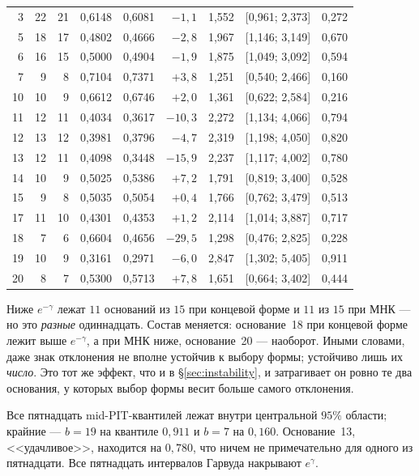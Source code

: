 \documentclass[11pt,a4paper]{article}
\theoremstyle{plain}
\theoremstyle{remark}
\newcommand{\eg}{e^{\gamma}}
\newcommand{\emg}{e^{-\gamma}}
\begin{document}
\begin{table}[t]
\begin{tabular}{rrrrrrrl r}
3 & 22 & 21 & 0{,}6148 & 0{,}6081 & $-1{,}1$ & 1{,}552 & [0{,}961; 2{,}373] & 0{,}272\\
5 & 18 & 17 & 0{,}4802 & 0{,}4666 & $-2{,}8$ & 1{,}967 & [1{,}146; 3{,}149] & 0{,}670\\
6 & 16 & 15 & 0{,}5000 & 0{,}4904 & $-1{,}9$ & 1{,}875 & [1{,}049; 3{,}092] & 0{,}594\\
7 & 9 & 8 & 0{,}7104 & 0{,}7371 & $+3{,}8$ & 1{,}251 & [0{,}540; 2{,}466] & 0{,}160\\
10 & 10 & 9 & 0{,}6612 & 0{,}6746 & $+2{,}0$ & 1{,}361 & [0{,}622; 2{,}584] & 0{,}216\\
11 & 12 & 11 & 0{,}4034 & 0{,}3617 & $-10{,}3$ & 2{,}272 & [1{,}134; 4{,}066] & 0{,}794\\
12 & 13 & 12 & 0{,}3981 & 0{,}3796 & $-4{,}7$ & 2{,}319 & [1{,}198; 4{,}050] & 0{,}820\\
13 & 12 & 11 & 0{,}4098 & 0{,}3448 & $-15{,}9$ & 2{,}237 & [1{,}117; 4{,}002] & 0{,}780\\
14 & 10 & 9 & 0{,}5025 & 0{,}5386 & $+7{,}2$ & 1{,}791 & [0{,}819; 3{,}400] & 0{,}528\\
15 & 9 & 8 & 0{,}5035 & 0{,}5054 & $+0{,}4$ & 1{,}766 & [0{,}762; 3{,}479] & 0{,}513\\
17 & 11 & 10 & 0{,}4301 & 0{,}4353 & $+1{,}2$ & 2{,}114 & [1{,}014; 3{,}887] & 0{,}717\\
18 & 7 & 6 & 0{,}6604 & 0{,}4656 & $-29{,}5$ & 1{,}298 & [0{,}476; 2{,}825] & 0{,}228\\
19 & 10 & 9 & 0{,}3161 & 0{,}2971 & $-6{,}0$ & 2{,}847 & [1{,}302; 5{,}405] & 0{,}911\\
20 & 8 & 7 & 0{,}5300 & 0{,}5713 & $+7{,}8$ & 1{,}651 & [0{,}664; 3{,}402] & 0{,}444\\
\bottomrule
\end{tabular}
\end{table}

Ниже $\emg$ лежат $11$ оснований из $15$ при концевой форме и $11$ из $15$ при
МНК --- но это \emph{разные} одиннадцать. Состав меняется: основание~18 при
концевой форме лежит выше $\emg$, а при МНК ниже, основание~20 --- наоборот.
Иными словами, даже знак отклонения не вполне устойчив к выбору формы; устойчиво
лишь их \emph{число}. Это тот же эффект, что и в \S\ref{sec:instability}, и
затрагивает он ровно те два основания, у которых выбор формы весит больше самого
отклонения.

Все пятнадцать mid-PIT-квантилей лежат внутри центральной $95\%$ области; крайние ---
$b=19$ на квантиле $0{,}911$ и $b=7$ на $0{,}160$. Основание~13, <<удачливое>>,
находится на $0{,}780$, что ничем не примечательно для одного из пятнадцати.
Все пятнадцать интервалов Гарвуда накрывают $\eg$.
\end{document}
